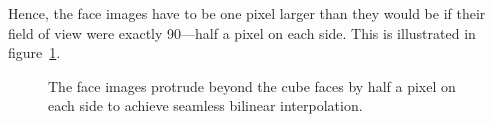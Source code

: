 \documentclass[
	a4paper,
	pagesize,
	10pt,
	oneside,
	idxtotoc,
	bibtotoc,
	BCOR10mm,
	DIV10
]{scrartcl} %
\begin{document}
Hence, the face images have to be one pixel larger than they would be if their field of view were exactly 90\textdegree—half a pixel on each side. This is illustrated in figure~\ref{fig:interpolation}.
\begin{figure}[htbp]
\centering
\setlength{\fboxsep}{3mm}
\caption{The face images protrude beyond the cube faces by half a pixel on each side to achieve seamless bilinear interpolation.}\label{fig:interpolation}
\end{figure}
\end{document}

